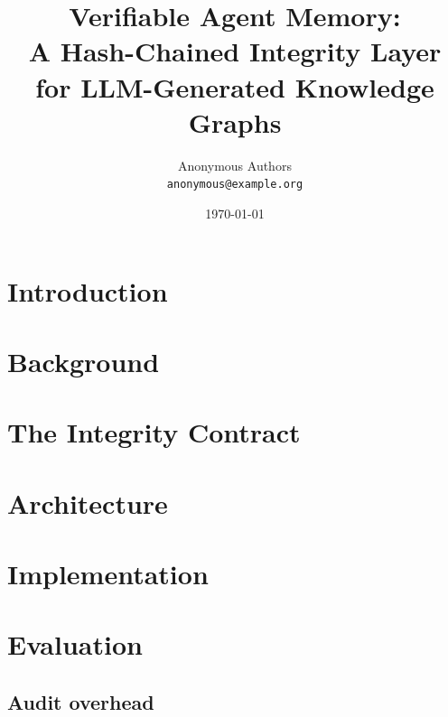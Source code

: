 \documentclass[11pt, letterpaper]{article}
\title{
  Verifiable Agent Memory: \\
  A Hash-Chained Integrity Layer for LLM-Generated Knowledge Graphs
}
\author{
  Anonymous Authors \\
  \texttt{anonymous@example.org}
}
\date{\today}
\theoremstyle{definition}
\theoremstyle{plain}
\theoremstyle{remark}
\begin{document}
\maketitle

\begin{abstract}

\end{abstract}

\section{Introduction}
\label{sec:intro}


\section{Background}
\label{sec:background}


\section{The Integrity Contract}
\label{sec:contract}


\section{Architecture}
\label{sec:architecture}


\section{Implementation}
\label{sec:implementation}


\section{Evaluation}
\label{sec:evaluation}

\subsection{Audit overhead}
\label{sec:eval-overhead}

\end{document}
